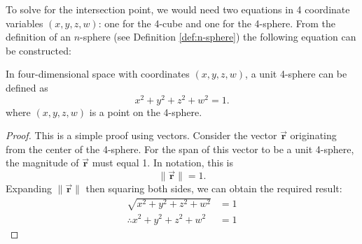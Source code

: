 To solve for the intersection point, we would need two equations in 4 coordinate variables $(x, y, z, w)$: one for the 4-cube and one for the 4-sphere. From the definition of an $n$-sphere (see Definition \ref{def:n-sphere}) the following equation can be constructed:
\begin{lemma}
In four-dimensional space with coordinates $(x, y, z, w)$, a unit 4-sphere can be defined as
\begin{equation}\label{eq:unit 4-sphere}
    x^2+y^2+z^2+w^2=1.
\end{equation}
where $(x, y, z, w)$ is a point on the 4-sphere.
\end{lemma}
\begin{proof}
    This is a simple proof using vectors. Consider the vector $\Vec{\mathbf{r}}$ originating from the center of the 4-sphere. For the span of this vector to be a unit 4-sphere, the magnitude of $\Vec{\mathbf{r}}$ must equal 1. In notation, this is $$\lVert\Vec{\mathbf{r}}\rVert = 1.$$
    Expanding $\lVert\Vec{\mathbf{r}}\rVert$ then squaring both sides, we can obtain the required result:
    \begin{align*}
        \sqrt{x^2+y^2+z^2+w^2}&=1\\
        \therefore x^2+y^2+z^2+w^2&=1
    \end{align*}
\end{proof}

